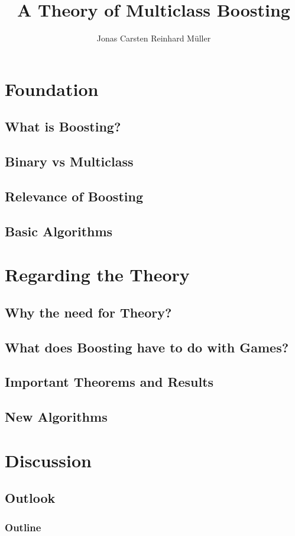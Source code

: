 \documentclass{beamer}
\author[Jonas Müller]{Jonas Carsten Reinhard Müller}
\title[Boosting]{A Theory of Multiclass Boosting}
\institute{}
\date{}
\begin{document}
\begin{frame}
    \titlepage
\end{frame}


\section{Foundation}
\subsection{What is Boosting?}
\subsection{Binary vs Multiclass}
\subsection{Relevance of Boosting}
\subsection{Basic Algorithms}
\section{Regarding the Theory}
\subsection{Why the need for Theory?}
\subsection{What does Boosting have to do with Games?}
\subsection{Important Theorems and Results}
\subsection{New Algorithms}
\section{Discussion}
\subsection{Outlook}






\begin{frame}
    \frametitle{Outline}
    \tableofcontents
\end{frame}




\end{document}
